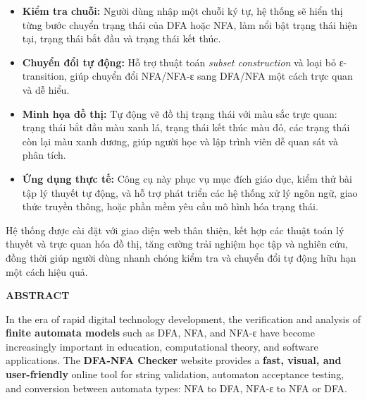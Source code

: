 \documentclass[12pt,a4paper]{report}
\begin{document}
\begin{itemize}
    \item \textbf{Kiểm tra chuỗi:} Người dùng nhập một chuỗi ký tự, hệ thống sẽ hiển thị từng bước chuyển trạng thái của DFA hoặc NFA, làm nổi bật trạng thái hiện tại, trạng thái bắt đầu và trạng thái kết thúc.
    \item \textbf{Chuyển đổi tự động:} Hỗ trợ thuật toán \textit{subset construction} và loại bỏ ε-transition, giúp chuyển đổi NFA/NFA-ε sang DFA/NFA một cách trực quan và dễ hiểu.
    \item \textbf{Minh họa đồ thị:} Tự động vẽ đồ thị trạng thái với màu sắc trực quan: trạng thái bắt đầu màu xanh lá, trạng thái kết thúc màu đỏ, các trạng thái còn lại màu xanh dương, giúp người học và lập trình viên dễ quan sát và phân tích.
    \item \textbf{Ứng dụng thực tế:} Công cụ này phục vụ mục đích giáo dục, kiểm thử bài tập lý thuyết tự động, và hỗ trợ phát triển các hệ thống xử lý ngôn ngữ, giao thức truyền thông, hoặc phần mềm yêu cầu mô hình hóa trạng thái.
\end{itemize}

\noindent
\hspace*{0.7cm}Hệ thống được cài đặt với giao diện web thân thiện, kết hợp các thuật toán lý thuyết và trực quan hóa đồ thị, tăng cường trải nghiệm học tập và nghiên cứu, đồng thời giúp người dùng nhanh chóng kiểm tra và chuyển đổi tự động hữu hạn một cách hiệu quả.  


\newpage
\begin{center}
    {\Large\textbf{ABSTRACT}}
\end{center}
\vspace{1cm}
\justifying
\hspace*{0.7cm}In the era of rapid digital technology development, the verification and analysis of \textbf{finite automata models} such as DFA, NFA, and NFA-ε have become increasingly important in education, computational theory, and software applications. The \textbf{DFA-NFA Checker} website provides a \textbf{fast, visual, and user-friendly} online tool for string validation, automaton acceptance testing, and conversion between automata types: NFA to DFA, NFA-ε to NFA or DFA.  
\end{document}
